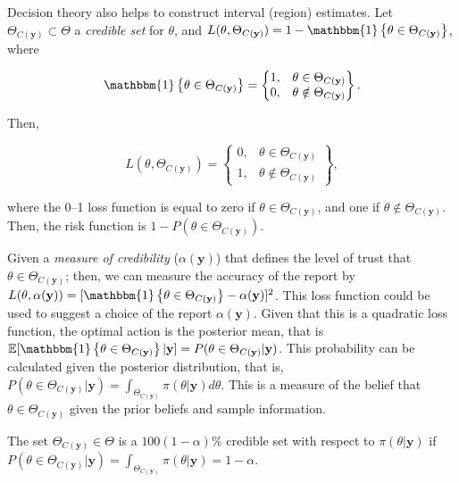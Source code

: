 Decision theory also helps to construct interval (region) estimates. Let $\Theta_{C(\mathbf{y})}\subset \Theta$ a \textit{credible set} for $\theta$, and $L(\theta,\Theta_{C(\mathbf{y})})=1-\mathbbm{1}\left\{\theta\in \Theta_{C(\mathbf{y})}\right\}$, where 

\begin{equation*}
	\mathbbm{1}\left\{\theta\in \Theta_{C(\mathbf{y})}\right\}=\begin{Bmatrix}1, & \theta\in \Theta_{C(\mathbf{y})}\\  
		0, & \theta\notin \Theta_{C(\mathbf{y})}
	\end{Bmatrix}.
\end{equation*}

Then,

\begin{equation*}
	L(\theta,\Theta_{C(\mathbf{y})})=\begin{Bmatrix}0, & \theta\in \Theta_{C(\mathbf{y})}\\  
		1, & \theta\notin \Theta_{C(\mathbf{y})}
	\end{Bmatrix},
\end{equation*}

where the 0--1 loss function is equal to zero if $\theta\in \Theta_{C(\mathbf{y})}$, and one if $\theta\notin \Theta_{C(\mathbf{y})}$. Then, the risk function is $1-P(\theta\in \Theta_{C(\mathbf{y})})$.

Given a \textit{measure of credibility} ($\alpha(\mathbf{y})$) that defines the level of trust that $\theta\in \Theta_{C(\mathbf{y})}$; then, we can measure the accuracy of the report by $L(\theta, \alpha(\mathbf{y}))=[\mathbbm{1}\left\{\theta\in \Theta_{C(\mathbf{y})}\right\}-\alpha(\mathbf{y})]^2$. This loss function could be used to suggest a choice of the report $\alpha(\mathbf{y})$. Given that this is a quadratic loss function, the optimal action is the posterior mean, that is $\mathbb{E}[\mathbbm{1}\left\{\theta\in \Theta_{C(\mathbf{y})}\right\}|\mathbf{y}]=P(\theta\in \Theta_{C(\mathbf{y})}|\mathbf{y})$. This probability can be calculated given the posterior distribution, that is, $P(\theta\in \Theta_{C(\mathbf{y})}|\mathbf{y})=\int_{\Theta_{C(\mathbf{y})}}\pi(\theta|\mathbf{y})d\theta$. This is a measure of the belief that $\theta\in \Theta_{C(\mathbf{y})}$ given the prior beliefs and sample information.

The set $\Theta_{C(\mathbf{y})}\in\Theta$ is a $100(1-\alpha)\%$ credible set with respect to $\pi(\theta|\mathbf{y})$ if $P(\theta\in \Theta_{C(\mathbf{y})}|\mathbf{y})=\int_{\Theta_{C(\mathbf{y})}}\pi(\theta|\mathbf{y})=1-\alpha$.

